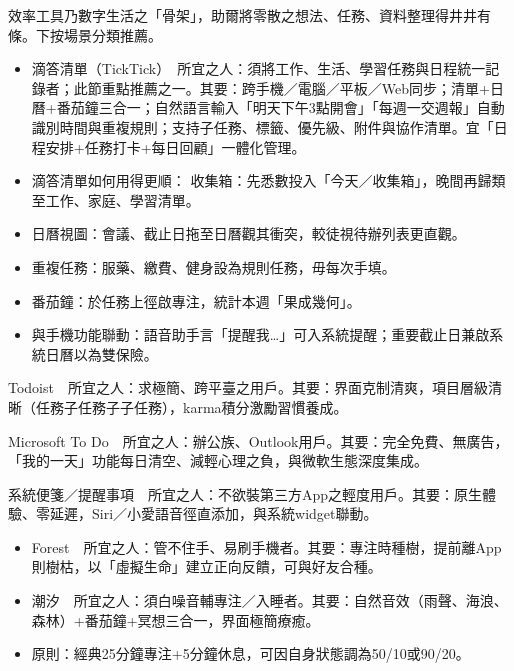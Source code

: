 


效率工具乃數字生活之「骨架」，助爾將零散之想法、任務、資料整理得井井有條。下按場景分類推薦。


\begin{itemize}
  \item 滴答清單（TickTick）　所宜之人：須將工作、生活、學習任務與日程統一記錄者；此節重點推薦之一。其要：跨手機／電腦／平板／Web同步；清單+日曆+番茄鐘三合一；自然語言輸入「明天下午3點開會」「每週一交週報」自動識別時間與重複規則；支持子任務、標籤、優先級、附件與協作清單。宜「日程安排+任務打卡+每日回顧」一體化管理。
  \item 滴答清單如何用得更順： 收集箱：先悉數投入「今天／收集箱」，晚間再歸類至工作、家庭、學習清單。
  \item 日曆視圖：會議、截止日拖至日曆觀其衝突，較徒視待辦列表更直觀。
  \item 重複任務：服藥、繳費、健身設為規則任務，毋每次手填。
  \item 番茄鐘：於任務上徑啟專注，統計本週「果成幾何」。
  \item 與手機功能聯動：語音助手言「提醒我…」可入系統提醒；重要截止日兼啟系統日曆以為雙保險。
\end{itemize}

Todoist　所宜之人：求極簡、跨平臺之用戶。其要：界面克制清爽，項目層級清晰（任務子任務子子任務），karma積分激勵習慣養成。

Microsoft To Do　所宜之人：辦公族、Outlook用戶。其要：完全免費、無廣告，「我的一天」功能每日清空、減輕心理之負，與微軟生態深度集成。

系統便箋／提醒事項　所宜之人：不欲裝第三方App之輕度用戶。其要：原生體驗、零延遲，Siri／小愛語音徑直添加，與系統widget聯動。


\begin{itemize}
  \item Forest　所宜之人：管不住手、易刷手機者。其要：專注時種樹，提前離App則樹枯，以「虛擬生命」建立正向反饋，可與好友合種。
  \item 潮汐　所宜之人：須白噪音輔專注／入睡者。其要：自然音效（雨聲、海浪、森林）+番茄鐘+冥想三合一，界面極簡療癒。
  \item 原則：經典25分鐘專注+5分鐘休息，可因自身狀態調為50/10或90/20。
\end{itemize}

